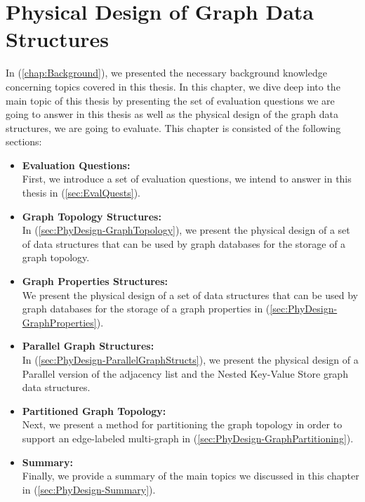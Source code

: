 {\chapter{Physical Design of Graph Data Structures}
\label{chap:PhysicalDesign}

In (\ref{chap:Background}),  we  presented  the  necessary  background  knowledge  concerning  topics covered in this thesis.  In this chapter, we dive deep into the main topic of this thesis by presenting the set of evaluation questions we are going to answer in this thesis as well as the physical design of the graph data structures, we are going to evaluate. This chapter is consisted of the following sections:
\begin{itemize}  
\item \textbf{Evaluation Questions:}\\
First, we introduce a set of evaluation questions, we intend to answer in this thesis in (\ref{sec:EvalQuests}).

\item\textbf{Graph Topology Structures:}\\
In (\ref{sec:PhyDesign-GraphTopology}), we present the physical design of a set of data structures that can be used by graph databases for the storage of a graph topology.

\item\textbf{Graph Properties Structures:}\\
We present the physical design of a set of data structures that can be used by graph databases for the storage of a graph properties in (\ref{sec:PhyDesign-GraphProperties}).

\item\textbf{Parallel Graph Structures:}\\
In (\ref{sec:PhyDesign-ParallelGraphStructs}), we present the physical design of a Parallel version of the adjacency list and the Nested Key-Value Store graph data structures.

\item\textbf{Partitioned Graph Topology:}\\
Next, we present a method for partitioning the graph topology in order to support an edge-labeled multi-graph in (\ref{sec:PhyDesign-GraphPartitioning}).

\item \textbf{Summary:}\\
Finally, we provide a summary of the main topics we discussed in this chapter in (\ref{sec:PhyDesign-Summary}).
\end{itemize}



}
